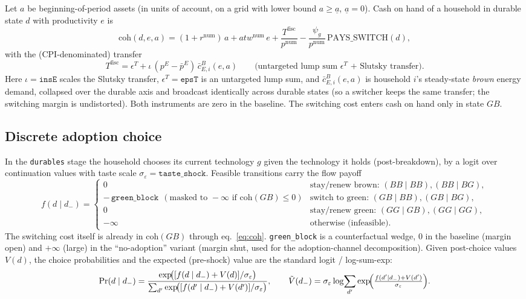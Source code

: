 \documentclass[11pt]{article}
\newcommand{\num}{\mathrm{num}}
\newcommand{\pE}{p^{E}}
\newcommand{\coh}{\mathrm{coh}}
\begin{document}
Let $a$ be beginning-of-period assets (in units of account, on a grid with lower
bound $a\ge \underline a$, $\underline a=0$). Cash on hand of a household in
durable state $d$ with productivity $e$ is
\begin{equation}
\coh(d,e,a)=(1+r^{\num})\,a+atw^{\num}\,e
+\frac{T^{\text{fisc}}}{p^{\num}}
-\frac{\psi_g}{p^{\num}}\,\mathrm{PAYS\_SWITCH}(d),
\label{eq:coh}
\end{equation}
with the (CPI-denominated) transfer
\begin{equation}
T^{\text{fisc}} = \epsilon^{T}+\iota\,(\pE-\bar\pE)\,\bar c^{B}_{E,i}(e,a)
\qquad\text{(untargeted lump sum $\epsilon^{T}$ + Slutsky transfer).}
\end{equation}
Here $\iota=\texttt{insE}$ scales the Slutsky transfer, $\epsilon^{T}=\texttt{epsT}$
is an untargeted lump sum, and $\bar c^{B}_{E,i}(e,a)$ is household $i$'s
steady-state \emph{brown} energy demand, collapsed over the durable axis and
broadcast identically across durable states (so a switcher keeps the same
transfer; the switching margin is undistorted). Both instruments are zero in the
baseline. The switching cost enters cash on hand only in state $GB$.

\subsection{Discrete adoption choice}\label{sec:logit}

In the \texttt{durables} stage the household chooses its current technology $g$
given the technology it holds (post-breakdown), by a logit over continuation
values with taste scale $\sigma_\varepsilon=\texttt{taste\_shock}$. Feasible
transitions carry the flow payoff
\begin{equation}
f(d\mid d_-)=
\begin{cases}
0 & \text{stay/renew brown: } (BB\mid BB),(BB\mid BG),\\
-\,\texttt{green\_block}\ \ (\text{masked to }-\infty\text{ if }\coh(GB)\le 0)
& \text{switch to green: } (GB\mid BB),(GB\mid BG),\\
0 & \text{stay/renew green: } (GG\mid GB),(GG\mid GG),\\
-\infty & \text{otherwise (infeasible).}
\end{cases}
\end{equation}
The switching cost itself is already in $\coh(GB)$ through
eq.~\eqref{eq:coh}. \texttt{green\_block} is a counterfactual wedge, $0$ in the
baseline (margin open) and $+\infty$ (large) in the ``no-adoption'' variant
(margin shut, used for the adoption-channel decomposition). Given post-choice
values $V(d)$, the choice probabilities and the expected (pre-shock) value are
the standard logit / log-sum-exp:
\begin{equation}
\Pr(d\mid d_-)=\frac{\exp\!\bigl([f(d\mid d_-)+V(d)]/\sigma_\varepsilon\bigr)}
{\sum_{d'}\exp\!\bigl([f(d'\mid d_-)+V(d')]/\sigma_\varepsilon\bigr)},
\qquad
\tilde V(d_-)=\sigma_\varepsilon\log\!\sum_{d'}\exp\!\Bigl(\tfrac{f(d'\mid d_-)+V(d')}{\sigma_\varepsilon}\Bigr).
\end{equation}
\end{document}
